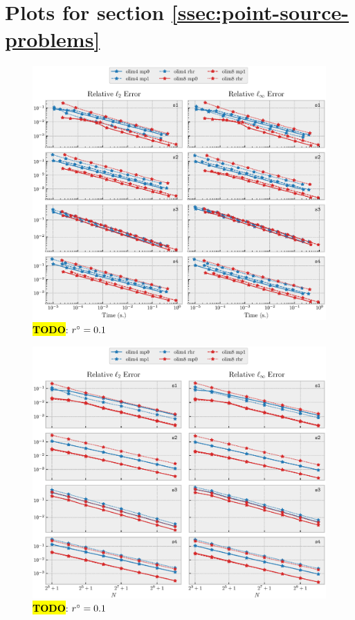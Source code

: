 \documentclass[sisc-eikonal.tex]{subfiles}
\begin{document}
\section{Plots for section
  \ref{ssec:point-source-problems}}\label{sec:point-source-plots}

\begin{figure}[H]
  \centering
  \includegraphics[width=\linewidth]{time_vs_error_2d.eps}
  \caption{\hl{\textbf{TODO}}: $r^\circ = 0.1$}
\end{figure}

\begin{figure}[H]
  \centering
  \includegraphics[width=\linewidth]{size_vs_error_2d.eps}
  \caption{\hl{\textbf{TODO}}: $r^\circ = 0.1$}
\end{figure}
\end{document}
